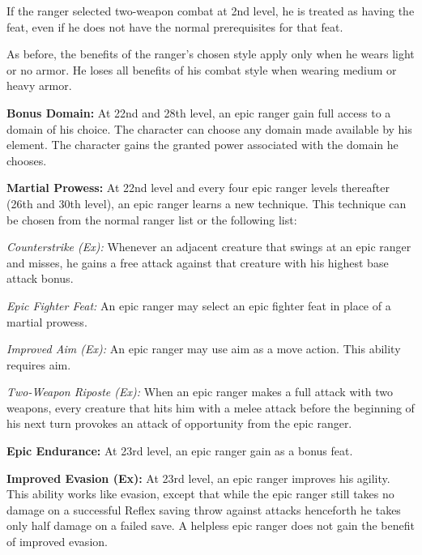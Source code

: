 If the ranger selected two-weapon combat at 2nd level, he is treated as having the  feat, even if he does not have the normal prerequisites for that feat.

As before, the benefits of the ranger's chosen style apply only when he wears light or no armor. He loses all benefits of his combat style when wearing medium or heavy armor.

\textbf{Bonus Domain:} At 22nd and 28th level, an epic ranger gain full access to a domain of his choice. The character can choose any domain made available by his element. The character gains the granted power associated with the domain he chooses.

\textbf{Martial Prowess:} At 22nd level and every four epic ranger levels thereafter (26th and 30th level), an epic ranger learns a new technique. This technique can be chosen from the normal ranger list or the following list:

\textit{Counterstrike (Ex):} Whenever an adjacent creature that swings at an epic ranger and misses, he gains a free attack against that creature with his highest base attack bonus.

\textit{Epic Fighter Feat:} An epic ranger may select an epic fighter feat in place of a martial prowess.

\textit{Improved Aim (Ex):} An epic ranger may use aim as a move action. This ability requires aim.

\textit{Two-Weapon Riposte (Ex):} When an epic ranger makes a full attack with two weapons, every creature that hits him with a melee attack before the beginning of his next turn provokes an attack of opportunity from the epic ranger.


\textbf{Epic Endurance:} At 23rd level, an epic ranger gain  as a bonus feat.

\textbf{Improved Evasion (Ex):} At 23rd level, an epic ranger improves his agility. This ability works like evasion, except that while the epic ranger still takes no damage on a successful Reflex saving throw against attacks henceforth he takes only half damage on a failed save. A helpless epic ranger does not gain the benefit of improved evasion.

